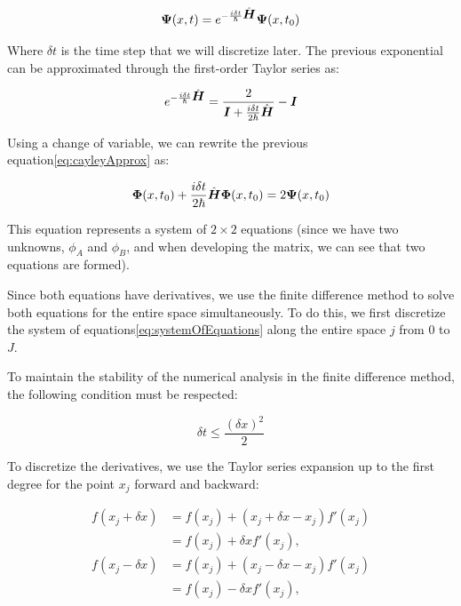 \begin{equation}
    \label{eq:TEOApplied}
    \mbox{\boldmath $\Psi$}(x,t)= e^{-\frac{i\delta t}{\hbar}\hat{\mbox{\boldmath $H$}}} \mbox{\boldmath $\Psi$}(x,t_0)
\end{equation}

\noindent Where $\delta t$ is the time step that we will discretize later.
The previous exponential can be approximated through the first-order Taylor series as:

\begin{equation}
    \label{eq:cayleyApprox}
    e^{-\frac{i\delta t}{\hbar}\hat{\mbox{\boldmath $H$}}} = \frac{2}{\mbox{\boldmath $I$} + \frac{i\delta t}{2\hbar}\hat{\mbox{\boldmath $H$}}}-\mbox{\boldmath $I$}
\end{equation}

Using a change of variable, we can rewrite the previous equation\eqref{eq:cayleyApprox} as:

\begin{equation}
    \label{eq:systemOfEquations}
    \mbox{\boldmath $\Phi$}(x,t_0) + \frac{i\delta t}{2\hbar}\hat{\mbox{\boldmath $H$}}\mbox{\boldmath $\Phi$}(x,t_0)=2\mbox{\boldmath $\Psi$}(x,t_0)
\end{equation}

\noindent This equation represents a system of $2\times2$ equations (since we have two unknowns, $\phi_A$ and $\phi_B$, and when developing the matrix, we can see that two equations are formed).

Since both equations have derivatives, we use the finite difference method to solve both equations for the entire space simultaneously.
To do this, we first discretize the system of equations\eqref{eq:systemOfEquations} along the entire space $j$ from $0$ to $J$.

To maintain the stability of the numerical analysis in the finite difference method, the following condition must be respected\cite{Carrillo2015}:

\begin{equation}
    \label{eq:stabilityCondition}
    \delta t \leq \frac{\left( \delta x \right)^2}{2}
\end{equation}

To discretize the derivatives, we use the Taylor series expansion up to the first degree for the point $x_j$ forward and backward:

\begin{align}
    \label{eq:TaylorBeforeAndAfter}
    f(x_j+\delta x)&=f(x_j) + (x_j+\delta x-x_j)f'(x_j)\nonumber\\
    &=f(x_j)+\delta xf'(x_j),\nonumber\\
    f(x_j-\delta x)&=f(x_j) + (x_j-\delta x-x_j)f'(x_j)\nonumber\\
    &=f(x_j)-\delta xf'(x_j),
\end{align}

